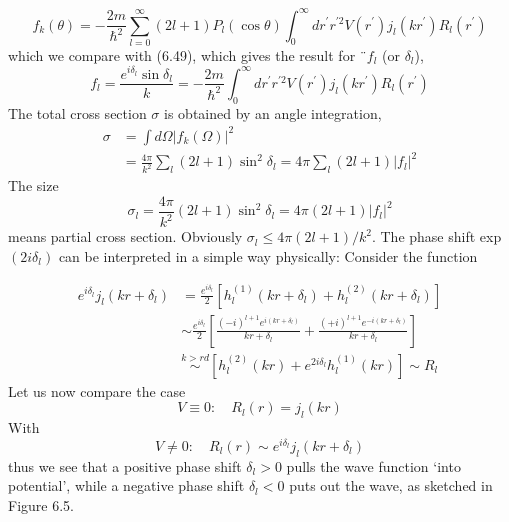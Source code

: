 \begin{equation}
    f_{k}(\theta)=-\frac{2 m}{\hbar^{2}} \sum_{l=0}^{\infty}(2 l+1) P_{l}(\cos \theta) \int_{0}^{\infty} d r^{\prime} r^{\prime 2} V\left(r^{\prime}\right) j_{l}\left(k r^{\prime}\right) R_{l}\left(r^{\prime}\right)
    \end{equation}
which we compare with (6.49), which gives the result for $¨f_l$ (or $\delta_l$),
\begin{equation}
    f_{l}=\frac{e^{i \delta_{l}} \sin \delta_{l}}{k}=-\frac{2 m}{\hbar^{2}} \int_{0}^{\infty} d r^{\prime} r^{\prime 2} V\left(r^{\prime}\right) j_{l}\left(k r^{\prime}\right) R_{l}\left(r^{\prime}\right)
    \end{equation}
The total cross section $\sigma$ is obtained by an angle integration,
\begin{equation}
\begin{aligned} \sigma &=\int d \Omega\left|f_{k}(\Omega)\right|^{2} \\ &=\frac{4 \pi}{k^{2}} \sum_{l}(2 l+1) \sin ^{2} \delta_{l}=4 \pi \sum_{l}(2 l+1)\left|f_{l}\right|^{2} \end{aligned}
\end{equation}
The size
\begin{equation}
    \sigma_{l}=\frac{4 \pi}{k^{2}}(2 l+1) \sin ^{2} \delta_{l}=4 \pi(2 l+1)\left|f_{l}\right|^{2}
    \end{equation}
means partial cross section. Obviously $\sigma_l ≤ 4\pi (2l + 1) / k^2$. The phase shift exp$ (2i \delta_l)$ can be interpreted in a simple way physically: Consider the function

\begin{equation}
\begin{aligned} e^{i \delta_{l}} j_{l}\left(k r+\delta_{l}\right) &=\frac{e^{i \delta_{l}}}{2}\left[h_{l}^{(1)}\left(k r+\delta_{l}\right)+h_{l}^{(2)}\left(k r+\delta_{l}\right)\right] \\ & \sim \frac{e^{i \delta_{l}}}{2}\left[\frac{(-i)^{l+1} e^{i\left(k r+\delta_{l}\right)}}{k r+\delta_{l}}+\frac{(+i)^{l+1} e^{-i\left(k r+\delta_{l}\right)}}{k r+\delta_{l}}\right] \\ & \stackrel{k>r d}{\sim}\left[h_{l}^{(2)}(k r)+e^{2 i \delta_{l}} h_{l}^{(1)}(k r)\right] \sim R_{l} \end{aligned}
\end{equation}
Let us now compare the case
\begin{equation}
    V \equiv 0: \quad R_{l}(r)=j_{l}(k r)
    \end{equation}
With
\begin{equation}
    V \not=0: \quad R_{l}(r) \sim e^{i \delta_{l}} j_{l}\left(k r+\delta_{l}\right)
    \end{equation}
thus we see that a positive phase shift $\delta_l> 0$ pulls the wave function `into potential', while a negative phase shift $\delta_l <0$ puts out the wave, as sketched in Figure 6.5.

